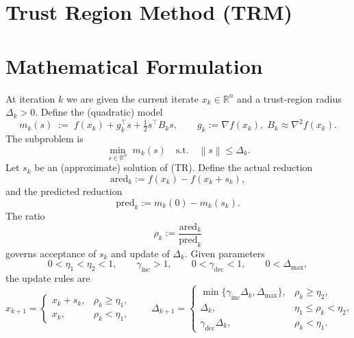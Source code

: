 \documentclass{article}
\newcommand{\norm}[1]{\left\lVert #1\right\rVert}
\newcommand{\R}{\mathbb{R}}
\begin{document}
\section*{Trust Region Method (TRM)}

\section*{Mathematical Formulation}
At iteration $k$ we are given the current iterate $x_k\in\R^n$ and a trust‑region radius $\Delta_k>0$.
Define the (quadratic) model
\[
m_k(s)\;:=\; f(x_k)+g_k^{\top}s+\tfrac12 s^{\top}B_k s,
\qquad 
g_k:=\nabla f(x_k),\;
B_k\approx \nabla^2 f(x_k).
\]
The subproblem is
\[
\min_{s\in\R^n}\; m_k(s)\quad\text{s.t.}\quad \norm{s}\le \Delta_k .\tag{TR}
\]
Let $s_k$ be an (approximate) solution of (TR).  Define the actual reduction
\[
\text{ared}_k:= f(x_k)-f(x_k+s_k),
\]
and the predicted reduction
\[
\text{pred}_k:= m_k(0)-m_k(s_k).
\]
The ratio
\[
\rho_k:=\frac{\text{ared}_k}{\text{pred}_k}
\]
governs acceptance of $s_k$ and update of $\Delta_k$.
Given parameters
\[
0<\eta_1<\eta_2<1,\qquad
\gamma_{\text{inc}}>1,\qquad
0<\gamma_{\text{dec}}<1,\qquad
0<\Delta_{\max},
\]
the update rules are
\[
x_{k+1}= \begin{cases}
x_k+s_k, & \rho_k\ge \eta_1,\\[4pt]
x_k,    & \rho_k<\eta_1,
\end{cases}
\qquad
\Delta_{k+1}= \begin{cases}
\min\{\gamma_{\text{inc}}\Delta_k,\Delta_{\max}\}, & \rho_k\ge \eta_2,\\[4pt]
\Delta_k,                                        & \eta_1\le\rho_k<\eta_2,\\[4pt]
\gamma_{\text{dec}}\Delta_k,                     & \rho_k<\eta_1 .
\end{cases}
\tag{1}
\]
\end{document}
